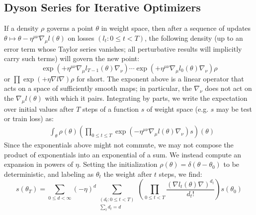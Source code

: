 \documentclass{article}
\begin{document}
\subsection*{Dyson Series for Iterative Optimizers}
    If a density $\rho$ governs a point $\theta$ in weight space, then after a
    sequence of updates $\theta \mapsto \theta - \eta^{\mu\nu} \nabla_\mu
    l(\theta)$ on losses $(l_t: 0\leq t < T)$, the following density (up to an
    error term whose Taylor series vanishes; all perturbative results will
    implicitly carry such terms) will govern the new point:
    \begin{equation}\label{eq:descexp}
        \exp\left(+\eta^{\mu\nu} \nabla_\mu l_{T-1}(\theta) \nabla_\nu\right) \cdots \exp\left(+\eta^{\mu\nu} \nabla_\mu l_0(\theta) \nabla_\nu\right) \rho
    \end{equation}
    or
    $
        \prod \exp\left(+\eta \nabla l \nabla\right) \rho
    $
    for short.
    The exponent above is a linear operator that acts on a space of
    sufficiently smooth maps; in particular, the $\nabla_\nu$ does not act on
    the $\nabla_\mu l(\theta)$ with which it pairs.  Integrating by parts, we
    write the expectation over initial values after $T$ steps of a function $s$
    of weight space (e.g. $s$ may be test or train loss) as:
    \begin{align}\label{eq:contraexp}
        &\int_\theta \rho(\theta) \left(\prod_{0 \leq t \leq T} \exp\left(-\eta^{\mu\nu} \nabla_\mu l(\theta) \nabla_\nu\right) s\right)(\theta)
    \end{align}
    Since the exponentials above might not commute, we may not compose
    the product of exponentials into an exponential of a sum.  We instead
    compute an expansion in powers of $\eta$.  Setting the initialization
    $\rho(\theta) = \delta(\theta-\theta_0)$ to be deterministic, and labeling
    as $\theta_t$ the weight after $t$ steps, we find:
    \begin{equation}\label{eq:dyson}
        s(\theta_T) =
        \sum_{0\leq d < \infty} (-\eta)^d \sum_{\substack{(d_t: 0\leq t<T) \\ \sum_t d_t = d}}
        \left(\prod_{0 \leq t < T} \frac{(\nabla l_t(\theta) \nabla)^{d_t}}{d_t!}\right) s (\theta_0)
    \end{equation}
\end{document}
